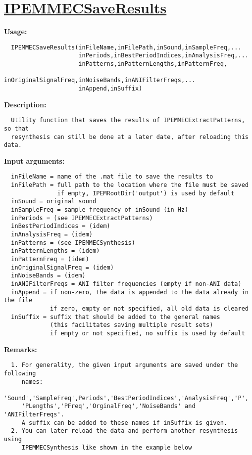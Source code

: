 \newpage
\section*{\hyperlink{Concepts:IPEMMECSaveResults}{IPEMMECSaveResults}}
\hypertarget{FuncRef:IPEMMECSaveResults}{}

\textbf{Usage:}
\begin{verbatim}  IPEMMECSaveResults(inFileName,inFilePath,inSound,inSampleFreq,...
                     inPeriods,inBestPeriodIndices,inAnalysisFreq,...
                     inPatterns,inPatternLengths,inPatternFreq,
                     inOriginalSignalFreq,inNoiseBands,inANIFilterFreqs,...
                     inAppend,inSuffix)

\end{verbatim}
\textbf{Description:}
\begin{verbatim}  Utility function that saves the results of IPEMMECExtractPatterns, so that
  resynthesis can still be done at a later date, after reloading this data.

\end{verbatim}
\textbf{Input arguments:}
\begin{verbatim}  inFileName = name of the .mat file to save the results to
  inFilePath = full path to the location where the file must be saved
               if empty, IPEMRootDir('output') is used by default
  inSound = original sound
  inSampleFreq = sample frequency of inSound (in Hz)
  inPeriods = (see IPEMMECExtractPatterns)
  inBestPeriodIndices = (idem)
  inAnalysisFreq = (idem)
  inPatterns = (see IPEMMECSynthesis)
  inPatternLengths = (idem)
  inPatternFreq = (idem)
  inOriginalSignalFreq = (idem)
  inNoiseBands = (idem)
  inANIFilterFreqs = ANI filter frequencies (empty if non-ANI data)
  inAppend = if non-zero, the data is appended to the data already in the file
             if zero, empty or not specified, all old data is cleared
  inSuffix = suffix that should be added to the general names
             (this facilitates saving multiple result sets)
             if empty or not specified, no suffix is used by default

\end{verbatim}
\textbf{Remarks:}
\begin{verbatim}  1. For generality, the given input arguments are saved under the following
     names:
     'Sound','SampleFreq',Periods','BestPeriodIndices','AnalysisFreq','P',
     'PLengths','PFreq','OrginalFreq','NoiseBands' and 'ANIFilterFreqs'.
     A suffix can be added to these names if inSuffix is given.
  2. You can later reload the data and perform another resynthesis using
     IPEMMECSynthesis like shown in the example below

\end{verbatim}
